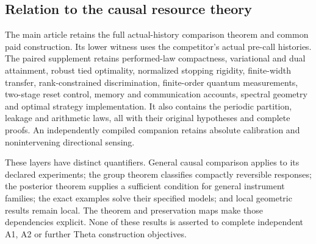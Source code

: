 \subsection*{Relation to the causal resource theory}
The main article retains the full actual-history comparison theorem and
common paid construction. Its lower witness uses the competitor's actual
pre-call histories. The paired supplement retains performed-law
compactness, variational and dual attainment, robust tied optimality,
normalized stopping rigidity, finite-width transfer, rank-constrained
discrimination, finite-order quantum measurements, two-stage reset control,
memory and communication accounts, spectral geometry and optimal strategy
implementation. It also contains the periodic partition, leakage and
arithmetic laws, all with their original hypotheses and complete proofs.
An independently compiled companion retains absolute calibration and
nonintervening directional sensing.

These layers have distinct quantifiers. General causal comparison applies
to its declared experiments; the group theorem classifies compactly
reversible responses; the posterior theorem supplies a sufficient
condition for general instrument families; the exact examples solve their
specified models; and local geometric results remain local. The theorem
and preservation maps make those dependencies explicit. None of these
results is asserted to complete independent A1, A2 or further Theta
construction objectives.
